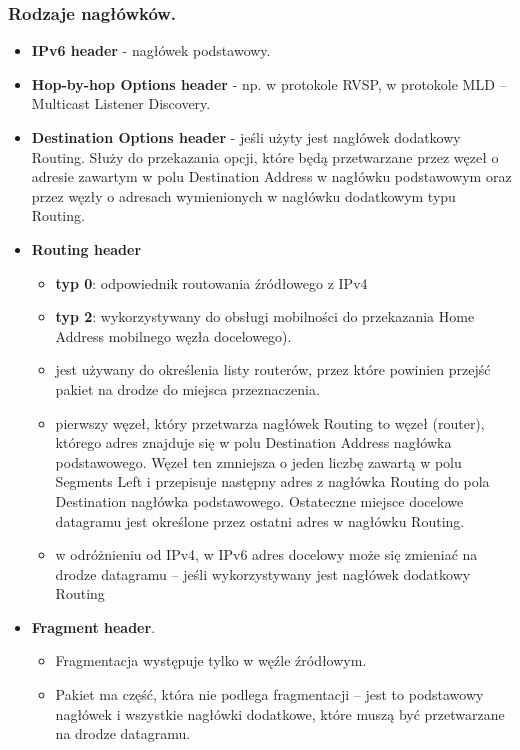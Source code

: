 \documentclass[../main.tex]{subfiles}
\begin{document}
    \subsubsection{Rodzaje nagłówków.}
    \begin{itemize}
        \item \textbf{IPv6 header} - nagłówek podstawowy.
        \item \textbf{Hop-by-hop Options header} - np. w protokole RVSP, w protokole MLD – Multicast Listener Discovery.
        \item \textbf{Destination Options header} - jeśli użyty jest nagłówek dodatkowy Routing. Służy do przekazania opcji, które będą przetwarzane przez węzeł o adresie zawartym w polu Destination Address w nagłówku podstawowym oraz przez węzły o adresach wymienionych w nagłówku dodatkowym typu Routing.
        \item \textbf{Routing header}
        \begin{itemize}
            \item \textbf{typ 0}: odpowiednik routowania źródłowego z IPv4
            \item \textbf{typ 2}: wykorzystywany do obsługi mobilności do przekazania Home Address mobilnego węzła docelowego).
            \item jest używany do określenia listy routerów, przez które powinien przejść pakiet na drodze do miejsca przeznaczenia.
            \item pierwszy węzeł, który przetwarza nagłówek Routing to węzeł (router), którego adres znajduje się w polu Destination Address nagłówka podstawowego. Węzeł ten zmniejsza o jeden liczbę zawartą w polu Segments Left i przepisuje następny adres z nagłówka Routing do pola Destination nagłówka podstawowego. Ostateczne miejsce docelowe datagramu jest określone przez ostatni adres w nagłówku Routing.
            \item w odróżnieniu od IPv4, w IPv6 adres docelowy może się zmieniać na drodze datagramu – jeśli wykorzystywany jest nagłówek dodatkowy Routing
        \end{itemize}
        \item \textbf{Fragment header}.
        \begin{itemize}
            \item Fragmentacja występuje tylko w węźle źródłowym.
            \item Pakiet ma część, która nie podlega fragmentacji – jest to podstawowy nagłówek i wszystkie nagłówki dodatkowe, które muszą być przetwarzane na drodze datagramu.

\end{itemize}
\end{itemize}
\end{document}
